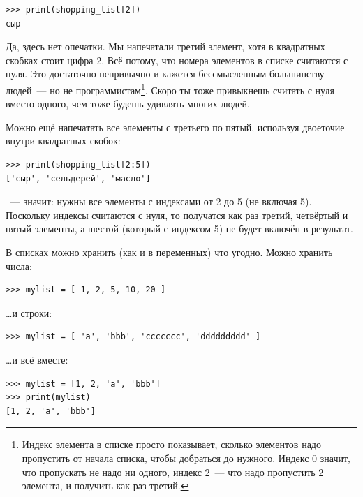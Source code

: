 \begin{listing}
\begin{verbatim}
>>> print(shopping_list[2])
сыр
\end{verbatim}
\end{listing}

Да, здесь нет опечатки. Мы напечатали третий элемент, хотя в квадратных скобках стоит цифра 2. Всё потому, что номера элементов в списке считаются с нуля. Это достаточно непривычно и кажется бессмысленным большинству людей — но не программистам\footnote{Индекс элемента в списке просто показывает, сколько элементов надо пропустить от начала списка, чтобы добраться до нужного. Индекс 0 значит, что пропускать не надо ни одного, индекс 2 — что надо пропустить 2 элемента, и получить как раз третий.}. Скоро ты тоже привыкнешь считать с нуля вместо одного, чем тоже будешь удивлять многих людей.

Можно ещё напечатать все элементы с третьего по пятый, используя двоеточие внутри квадратных скобок:

\begin{listing}
\begin{verbatim}
>>> print(shopping_list[2:5])
['сыр', 'сельдерей', 'масло']
\end{verbatim}
\end{listing}

\code{[2:5]} — значит: нужны все элементы с индексами от 2 до 5 (не включая 5). Поскольку индексы считаются с нуля, то получатся как раз третий, четвёртый и пятый элементы, а шестой (который с индексом 5) не будет включён в результат.

В списках можно хранить (как и в переменных) что угодно. Можно хранить числа:

\begin{listing}
\begin{verbatim}
>>> mylist = [ 1, 2, 5, 10, 20 ]
\end{verbatim}
\end{listing}

…и строки:

\begin{listing}
\begin{verbatim}
>>> mylist = [ 'a', 'bbb', 'ccccccc', 'ddddddddd' ]
\end{verbatim}
\end{listing}

…и всё вместе:

\begin{listing}
\begin{verbatim}
>>> mylist = [1, 2, 'a', 'bbb']
>>> print(mylist)
[1, 2, 'a', 'bbb']
\end{verbatim}
\end{listing}

